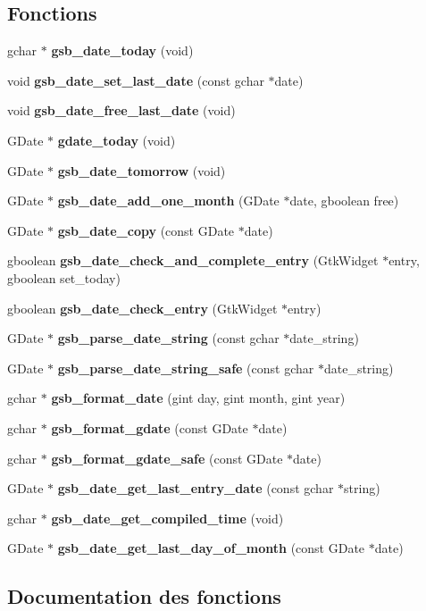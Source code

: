 \subsection*{Fonctions}
\begin{DoxyCompactItemize}
\item 
gchar $\ast$ {\bf gsb\_\-date\_\-today} (void)
\item 
void {\bf gsb\_\-date\_\-set\_\-last\_\-date} (const gchar $\ast$date)
\item 
void {\bf gsb\_\-date\_\-free\_\-last\_\-date} (void)
\item 
GDate $\ast$ {\bf gdate\_\-today} (void)
\item 
GDate $\ast$ {\bf gsb\_\-date\_\-tomorrow} (void)
\item 
GDate $\ast$ {\bf gsb\_\-date\_\-add\_\-one\_\-month} (GDate $\ast$date, gboolean free)
\item 
GDate $\ast$ {\bf gsb\_\-date\_\-copy} (const GDate $\ast$date)
\item 
gboolean {\bf gsb\_\-date\_\-check\_\-and\_\-complete\_\-entry} (GtkWidget $\ast$entry, gboolean set\_\-today)
\item 
gboolean {\bf gsb\_\-date\_\-check\_\-entry} (GtkWidget $\ast$entry)
\item 
GDate $\ast$ {\bf gsb\_\-parse\_\-date\_\-string} (const gchar $\ast$date\_\-string)
\item 
GDate $\ast$ {\bf gsb\_\-parse\_\-date\_\-string\_\-safe} (const gchar $\ast$date\_\-string)
\item 
gchar $\ast$ {\bf gsb\_\-format\_\-date} (gint day, gint month, gint year)
\item 
gchar $\ast$ {\bf gsb\_\-format\_\-gdate} (const GDate $\ast$date)
\item 
gchar $\ast$ {\bf gsb\_\-format\_\-gdate\_\-safe} (const GDate $\ast$date)
\item 
GDate $\ast$ {\bf gsb\_\-date\_\-get\_\-last\_\-entry\_\-date} (const gchar $\ast$string)
\item 
gchar $\ast$ {\bf gsb\_\-date\_\-get\_\-compiled\_\-time} (void)
\item 
GDate $\ast$ {\bf gsb\_\-date\_\-get\_\-last\_\-day\_\-of\_\-month} (const GDate $\ast$date)
\end{DoxyCompactItemize}


\subsection{Documentation des fonctions}
